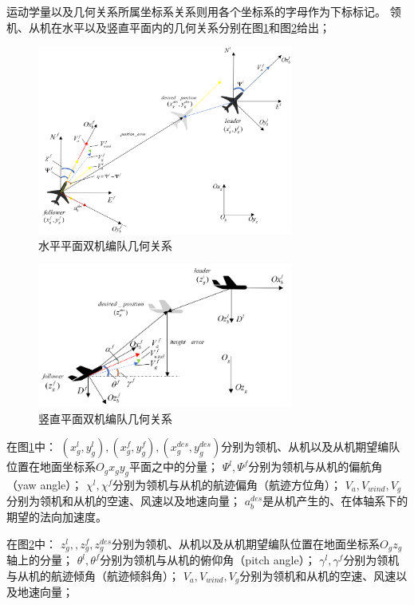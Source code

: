 运动学量以及几何关系所属坐标系关系则用各个坐标系的字母作为下标标记。
领机、从机在水平以及竖直平面内的几何关系分别在图\ref{fig:c02-2d_level_motion}和图\ref{fig:c02-2d_vert_motion}给出；
\begin{figure}[H]
    \centering
    \includegraphics[width=0.75\textwidth]{figures/c2/2d_level_motion.png}
    \caption{水平平面双机编队几何关系}\label{fig:c02-2d_level_motion}
\end{figure}
\begin{figure}[H]
    \centering
    \includegraphics[width=0.75\textwidth]{figures/c2/2d_vert_motion.png}
    \caption{竖直平面双机编队几何关系}\label{fig:c02-2d_vert_motion}
\end{figure}
在图\ref{fig:c02-2d_level_motion}中：
$(x_{g}^l,y_{g}^l),(x_{g}^f,y_{g}^f),(x_{g}^{des},y_{g}^{des})$分别为领机、从机以及从机期望编队位置在地面坐标系$O_gx_gy_g$平面之中的分量；
$\Psi^l,\Psi^f$分别为领机与从机的偏航角（yaw angle）；
$\chi^l,\chi^f$分别为领机与从机的航迹偏角（航迹方位角）；
$V_a,V_{wind},V_g$分别为领机和从机的空速、风速以及地速向量；
$a_{b}^{des}$是从机产生的、在体轴系下的期望的法向加速度。

在图\ref{fig:c02-2d_vert_motion}中：
$z_{g}^l,,z_{g}^f,z_{g}^{des}$分别为领机、从机以及从机期望编队位置在地面坐标系$O_gz_g$轴上的分量；
$\theta^l,\theta^f$分别为领机与从机的俯仰角（pitch angle）；
$\gamma^l,\gamma^f$分别为领机与从机的航迹倾角（航迹倾斜角）；
$V_a,V_{wind},V_g$分别为领机和从机的空速、风速以及地速向量；

